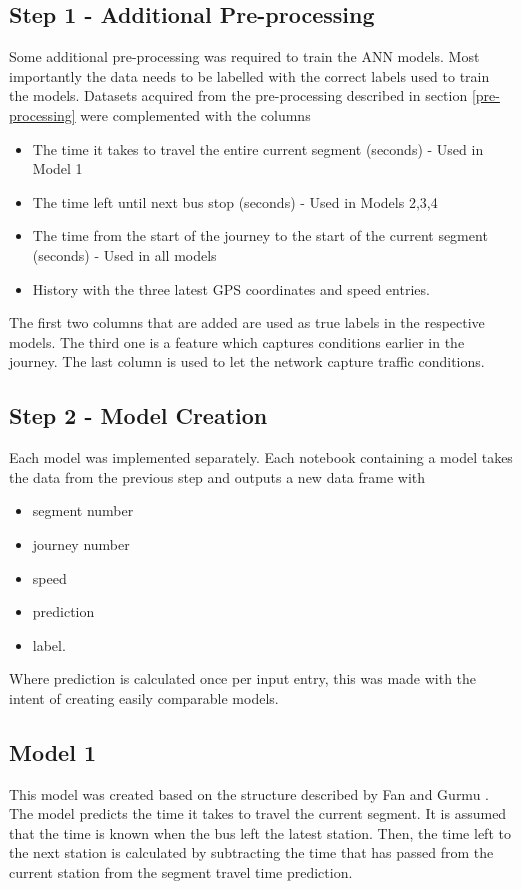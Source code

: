 \subsection{Step 1 - Additional Pre-processing}
Some additional pre-processing was required to train the ANN models. Most importantly the data needs to be labelled with the correct labels used to train the models. Datasets acquired from the pre-processing described in section \ref{pre-processing} were complemented with the columns

\begin{itemize}
    \item The time it takes to travel the entire current segment (seconds) - Used in Model 1
    \item The time left until next bus stop (seconds) - Used in Models 2,3,4
    \item The time from the start of the journey to the start of the current segment (seconds) - Used in all models
    \item History with the three latest GPS coordinates and speed entries.
\end{itemize}

\noindent The first two columns that are added are used as true labels in the respective models. The third one is a feature which captures conditions earlier in the journey. The last column is used to let the network capture traffic conditions.

\subsection{Step 2 - Model Creation}
Each model was implemented separately. Each notebook containing a model takes the data from the previous step and outputs a new data frame with 

\begin{itemize}
    \item segment number
    \item journey number
    \item speed
    \item prediction
    \item label.
\end{itemize}

Where prediction is calculated once per input entry, this was made with the intent of creating easily comparable models.

\subsection{Model 1}
This model was created based on the structure described by Fan and Gurmu \cite{brazilANN}. The model predicts the time it takes to travel the current segment. It is assumed that the time is known when the bus left the latest station. Then, the time left to the next station is calculated by subtracting the time that has passed from the current station from the segment travel time prediction.

